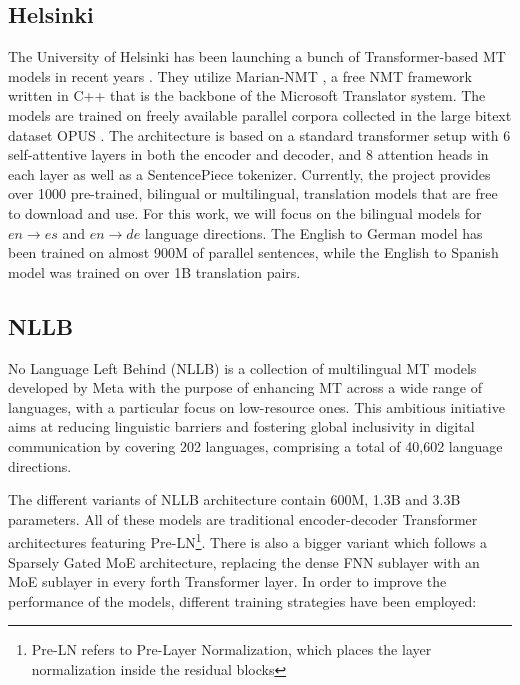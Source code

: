 \documentclass[11pt,english,listoffigures,listoftables]{tfgetsinf}
\begin{document}
\subsection{Helsinki}

The University of Helsinki has been launching a bunch of Transformer-based MT models in recent years \cite{Tiedemann2020-OPUSMT}. They utilize Marian-NMT \cite{junczys2018marian}, a free NMT framework written in C++ that is the backbone of the Microsoft Translator system. The models are trained on freely available parallel corpora collected in the large bitext dataset OPUS \cite{Aulamo2019opus}. The architecture is based on a standard transformer setup with 6 self-attentive layers in both the encoder and decoder, and 8 attention heads in each layer as well as a SentencePiece tokenizer. Currently, the project provides over 1000 pre-trained, bilingual or multilingual, translation models that are free to download and use. For this work, we will focus on the bilingual models for $en \rightarrow es$ and $en \rightarrow de$ language directions. The English to German model has been trained on almost 900M of parallel sentences, while the English to Spanish model was trained on over 1B translation pairs. 



\subsection{NLLB}

No Language Left Behind (NLLB)\cite{costa2022nllb} is a collection of multilingual MT models developed by Meta with the purpose of enhancing MT across a wide range of languages, with a particular focus on low-resource ones. This ambitious initiative aims at reducing linguistic barriers and fostering global inclusivity in digital communication by covering 202 languages, comprising a total of 40,602 language directions. 

The different variants of NLLB architecture contain 600M, 1.3B and 3.3B parameters. All of these models are traditional encoder-decoder Transformer architectures featuring Pre-LN\footnote{Pre-LN refers to Pre-Layer Normalization, which places the layer normalization inside the residual blocks}. There is also a bigger variant which follows a Sparsely Gated MoE architecture, replacing the dense FNN sublayer with an MoE sublayer in every forth Transformer layer.
In order to improve the performance of the models, different training strategies have been employed:
\end{document}
